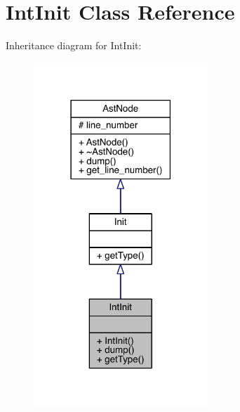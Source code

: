 \hypertarget{class_int_init}{}\section{Int\+Init Class Reference}
\label{class_int_init}


Inheritance diagram for Int\+Init\+:\nopagebreak
\begin{figure}[H]
\begin{center}
\leavevmode
\includegraphics[width=186pt]{class_int_init__inherit__graph}
\end{center}
\end{figure}


